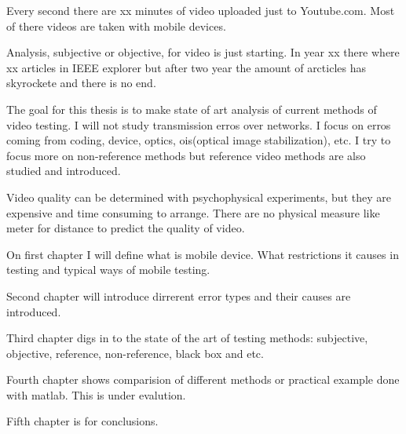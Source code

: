 
Every second there are xx minutes of video uploaded just to Youtube.com. Most
of there videos are taken with mobile devices. 

Analysis, subjective or objective, for video is just starting. In year xx
there where xx articles in IEEE explorer but after two year the amount of
arcticles has skyrockete and there is no end. 

The goal for this thesis is to make state of art analysis of current methods
of video testing. I will not study transmission erros over networks. I focus 
on erros coming from coding, device, optics,
ois(optical image stabilization), etc. I try to focus more on non-reference
methods but reference video methods are also studied and introduced. 

Video quality can be determined with psychophysical experiments, but they are
expensive and time consuming to arrange. There are no physical measure like
meter for distance to predict the quality of video. 


On first chapter I will define what is mobile device. What restrictions it
causes in testing and typical ways of mobile testing.  

Second chapter will introduce dirrerent error types and their causes are introduced. 

Third chapter digs in to the state of the art of testing methods: 
subjective, objective, reference, non-reference, black box and etc. 

Fourth chapter shows comparision of different methods or practical example
done with matlab. This is under evalution. 

Fifth chapter is for conclusions. 

